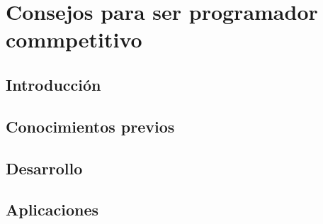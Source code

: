 \chapter{Consejos para ser programador commpetitivo}
\section{Introducción}

\section{Conocimientos previos}

\section{Desarrollo}

%
\section{Aplicaciones}

%
%